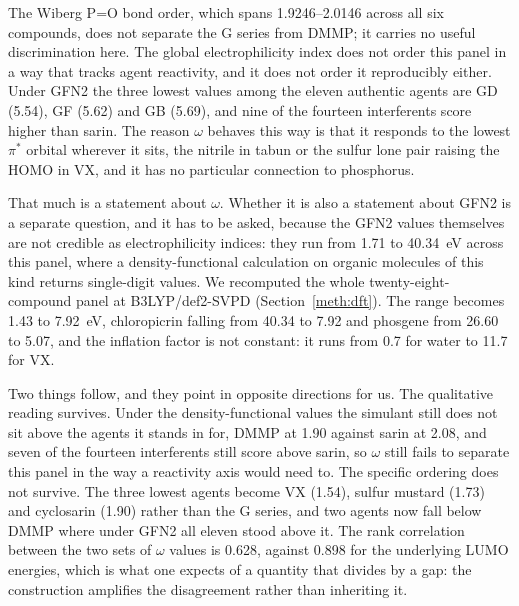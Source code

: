 \documentclass[journal=jacsat,manuscript=suppinfo,margin=1in]{achemso}
\begin{document}
\begin{table}[!htb]
\centering
\caption{GFN2-xTB local reactivity at phosphorus for the six phosphorus-bearing
compounds. $f^{+}(\mathrm{P})$ is the condensed Fukui index for nucleophilic
attack at phosphorus, in the frontier-electron formulation of Parr and
Yang\cite{parryang1984} with the atomic condensation of Yang and
Mortier.\cite{yangmortier1986} $\omega$ is the global electrophilicity index in the
definition of Parr et al.~\cite{parr1999} with $\eta$ equal to half the
HOMO--LUMO gap, and $\omega_k = \omega f^{+}(\mathrm{P})$ is the composite local
electrophilicity of Domingo et al.~\cite{domingo2016}. The two reactivity
conventions disagree about VX and the text says why.}
\label{tab:plocal}
\small

\end{table}

The Wiberg P=O bond order,\cite{wiberg1968,mayer1983} which spans
1.9246--2.0146 across all six compounds, does
not separate the G series from DMMP; it carries no useful discrimination here.
The global electrophilicity index does not order this panel in a way that
tracks agent reactivity, and it does not order it reproducibly either. Under
GFN2 the three lowest values among the eleven authentic agents are GD (5.54),
GF (5.62) and GB (5.69), and nine of the fourteen interferents score higher
than sarin. The reason $\omega$ behaves this way is that it responds to the
lowest $\pi^{*}$ orbital wherever it sits, the nitrile in tabun or the sulfur
lone pair raising the HOMO in VX, and it has no particular connection to
phosphorus.

That much is a statement about $\omega$. Whether it is also a statement about
GFN2 is a separate question, and it has to be asked, because the GFN2 values
themselves are not credible as electrophilicity indices: they run from 1.71 to
40.34~eV across this panel, where a density-functional calculation on organic
molecules of this kind returns single-digit values. We recomputed the whole
twenty-eight-compound panel at B3LYP/def2-SVPD (Section~\ref{meth:dft}). The
range becomes 1.43 to 7.92~eV, chloropicrin falling from 40.34 to 7.92 and
phosgene from 26.60 to 5.07, and the inflation factor is not constant: it runs
from 0.7 for water to 11.7 for VX.

Two things follow, and they point in opposite directions for us. The qualitative
reading survives. Under the density-functional values the simulant still does
not sit above the agents it stands in for, DMMP at 1.90 against sarin at 2.08,
and seven of the fourteen interferents still score above sarin, so $\omega$
still fails to separate this panel in the way a reactivity axis would need to.
The specific ordering does not survive. The three lowest agents become VX
(1.54), sulfur mustard (1.73) and cyclosarin (1.90) rather than the G series,
and two agents now fall below DMMP where under GFN2 all eleven stood above it.
The rank correlation between the two sets of $\omega$ values is 0.628, against
0.898 for the underlying LUMO energies, which is what one expects of a quantity
that divides by a gap: the construction amplifies the disagreement rather than
inheriting it.
\end{document}
